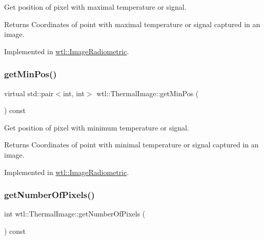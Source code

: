 Get position of pixel with maximal temperature or signal. 

\begin{DoxyReturn}{Returns}
Coordinates of point with maximal temperature or signal captured in an image. 
\end{DoxyReturn}


Implemented in \hyperlink{classwtl_1_1_image_radiometric_ae1bdd0fb2335a6482ff3656dd8e9f7a3}{wtl\+::\+Image\+Radiometric}.

\mbox{\label{classwtl_1_1_thermal_image_a9887878b3965566660ce4c434873603a}} 
\subsubsection{\texorpdfstring{get\+Min\+Pos()}{getMinPos()}}
{\footnotesize\ttfamily virtual std\+::pair$<$int, int$>$ wtl\+::\+Thermal\+Image\+::get\+Min\+Pos (\begin{DoxyParamCaption}{ }\end{DoxyParamCaption}) const\hspace{0.3cm}{\ttfamily [pure virtual]}}



Get position of pixel with minimum temperature or signal. 

\begin{DoxyReturn}{Returns}
Coordinates of point with minimal temperature or signal captured in an image. 
\end{DoxyReturn}


Implemented in \hyperlink{classwtl_1_1_image_radiometric_a4f8f918914c3de913e781de02c42e846}{wtl\+::\+Image\+Radiometric}.

\mbox{\label{classwtl_1_1_thermal_image_aa1a417dd0315dca5ecc14fb49e05cfc2}} 
\subsubsection{\texorpdfstring{get\+Number\+Of\+Pixels()}{getNumberOfPixels()}}
{\footnotesize\ttfamily int wtl\+::\+Thermal\+Image\+::get\+Number\+Of\+Pixels (\begin{DoxyParamCaption}{ }\end{DoxyParamCaption}) const}



